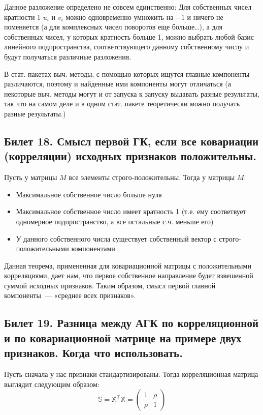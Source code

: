 Данное разложение определено не совсем единственно: Для собственных чисел кратности 1 $u_i$ и $v_i$ можно одновременно умножить на $-1$ и ничего не поменяется (а для комплексных чисел поворотов еще больше…), а 
для собственных чисел, у которых кратность больше 1, можно выбрать любой базис линейного подпространства, соответствующего данному собственному числу и будут получаться различные разложения. 

В стат. пакетах выч. методы, с помощью которых ищутся главные компоненты различаются, поэтому и найденные ими компоненты могут отличаться (а некоторые выч. методы могут и от запуска к запуску выдавать разные результаты, так что на самом деле и в одном стат. пакете теоретически можно получать разные результаты.)

\subsection{Билет 18. Смысл первой ГК, если все ковариации (корреляции) исходных признаков положительны.}
\begin{thm}
Пусть у матрицы $M$ все элементы строго-положительны. Тогда у матрицы $M$:
\begin{itemize}
\item Максимальное собственное число больше нуля
\item Максимальное собственное число имеет кратность 1 (т.е. ему соответвует одномерное подпространство, а все остальные с.ч. меньше его)
\item У данного собственного числа существует собственный вектор с строго-положительными компонентами
\end{itemize}
\end{thm}
Данная теорема, примененная для ковариационной матрицы с положительными корреляциями, дает нам, что первое собственное направление будет взвешенной суммой исходных признаков. Таким образом,  смысл первой главной компоненты — «среднее всех признаков». 

\subsection{Билет 19. Разница между АГК по корреляционной и по ковариационной матрице на примере двух признаков.
Когда что использовать.}  

Пусть сначала у нас признаки стандартизированы. Тогда корреляционная матрица выглядит следующим образом:
$$\mathbb{S} = \mathbb{X}^{\intercal} \mathbb{X} = \begin{pmatrix}
1 & \rho \\
\rho & 1
\end{pmatrix}
$$

